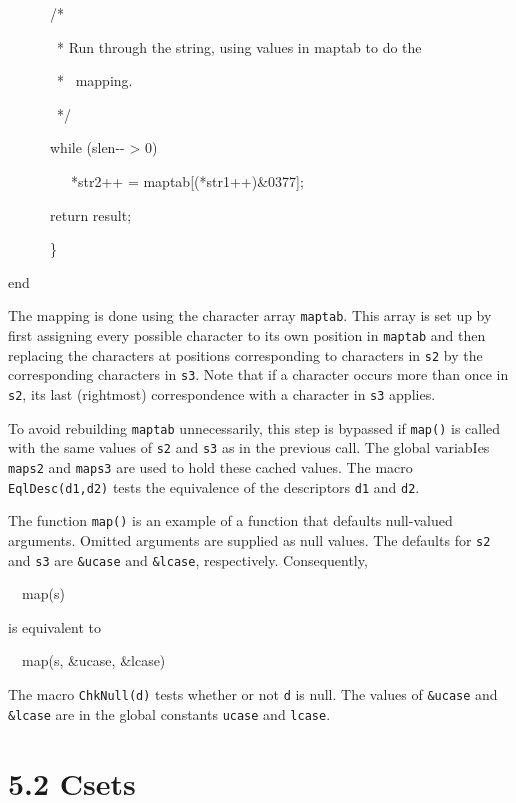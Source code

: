 \bigskip


\ \ \ \ \ \ /*


\ \ \ \ \ \ \ * Run through the string, using values in maptab to do the


\ \ \ \ \ \ \ * \ mapping.


\ \ \ \ \ \ \ */


\ \ \ \ \ \ while (slen-{}- {\textgreater} 0)


\ \ \ \ \ \ \ \ \ *str2++ = maptab[(*str1++)\&0377];


\bigskip


\ \ \ \ \ \ return result;


\ \ \ \ \ \ \}


end


\bigskip


The mapping is done using the character array \texttt{maptab}. This
array is set up by first assigning every possible character to its own
position in \texttt{maptab} and then replacing the characters at
positions corresponding to characters in \texttt{s2} by the
corresponding characters in \texttt{s3}. Note that if a character
occurs more than once in \texttt{s2}, its last (rightmost)
correspondence with a character in \texttt{s3} applies.

To avoid rebuilding \texttt{maptab} unnecessarily, this step is
bypassed if \texttt{map()} is called with the same values of
\texttt{s2} and \texttt{s3} as in the previous call. The global
variabIes \texttt{maps2} and \texttt{maps3} are used to hold these
{\textquotedbl}cached{\textquotedbl} values. The macro
\texttt{EqlDesc(d1,d2)} tests the equivalence of the descriptors
\texttt{d1} and \texttt{d2}.

The function \texttt{map()} is an example of a function that defaults
null-valued arguments. Omitted arguments are supplied as null
values. The defaults for \texttt{s2} and \texttt{s3} are
\texttt{\&ucase} and \texttt{\&lcase}, respectively. Consequently,

{\ttfamily\mdseries
\ \ map(s)}

\noindent
is equivalent to

{\ttfamily\mdseries
\ \ map(s, \&ucase, \&lcase)}


The macro \texttt{ChkNull(d)} tests whether or not \texttt{d} is
null. The values of \texttt{\&ucase} and \texttt{\&lcase} are in the
global constants \texttt{ucase} and \texttt{lcase}.

\section[5.2 Csets]{5.2 Csets}

